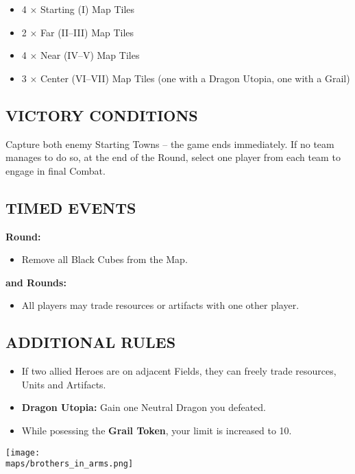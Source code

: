 \begin{multicols*}{2}
\begin{itemize}
  \item 4 × Starting (I) Map Tiles
  \item 2 × Far (II–III) Map Tiles
  \item 4 × Near (IV–V) Map Tiles
  \item 3 × Center (VI–VII) Map Tiles (one with a Dragon Utopia, one with a Grail)
\end{itemize}

\subsection*{\MakeUppercase{Victory Conditions}}
Capture both enemy Starting Towns -- the game ends immediately.
If no team manages to do so, at the end of the  Round, select one player from each team to engage in final Combat.

\subsection*{\MakeUppercase{Timed Events}}
\textbf{ Round:}
\begin{itemize}
  \item Remove all Black Cubes from the Map.
\end{itemize}
\textbf{ and  Rounds:}
\begin{itemize}
  \item All players may trade resources or artifacts with one other player.
\end{itemize}

\subsection*{\MakeUppercase{Additional Rules}}
\begin{itemize}
  \item If two allied Heroes are on adjacent Fields, they can freely trade resources, Units and Artifacts.
  \item \textbf{Dragon Utopia:} Gain one Neutral Dragon you defeated.
  \item While posessing the \textbf{Grail Token}, your  limit is increased to 10.
\end{itemize}

\vspace*{\fill}
\hspace*{-1.5em}\texttt{[image: \\maps/brothers\_in\_arms.png]}
\end{multicols*}
